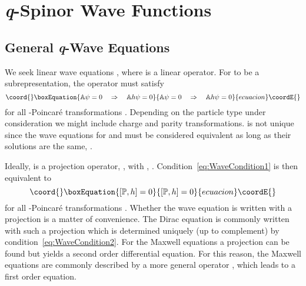 \documentclass[12pt,a4paper]{article}
\providecommand{\Proj}{\mathbb{P}}
\begin{document}
\section{\textit{q}-Spinor Wave Functions}

\subsection{General \textit{q}-Wave Equations}

We seek linear wave equations \coordHE{}, where \coordHE{}
is a linear operator. For \coordHE{} to be a subrepresentation,
the operator must satisfy
\begin{equation}\coord{}\boxEquation{
\label{eq:WaveCondition1}
  \mathbb{A}\psi = 0 \quad\Rightarrow\quad \mathbb{A}h\psi = 0
}{
\mathbb{A}\psi = 0 \quad\Rightarrow\quad \mathbb{A}h\psi = 0
}{ecuacion}\coordE{}\end{equation}
for all \coordHE{}-Poincar{\'e} transformations \coordHE{}. Depending on the particle
type under consideration we might include charge and parity
transformations. \coordHE{} is not unique since the wave
equations for \coordHE{} and \coordHE{} must be considered
equivalent as long as their solutions are the same, \coordHE{}. 

Ideally, \coordHE{} is a projection operator, \myHighlight{$\mathbb{A}=\Proj$}\coordHE{},
with \myHighlight{$\Proj^2=\Proj$}\coordHE{}, \myHighlight{$\Proj^* = \Proj$}\coordHE{}.
Condition~\eqref{eq:WaveCondition1} is then equivalent to
\begin{equation}\coord{}\boxEquation{
\label{eq:WaveCondition2}
  [\Proj,h] = 0
}{
[\Proj,h] = 0
}{ecuacion}\coordE{}\end{equation}
for all \coordHE{}-Poincar{\'e} transformations \coordHE{}. Whether the wave equation is
written with a projection is a matter of convenience. The Dirac
equation is commonly written with such a projection which is determined
uniquely (up to complement) by condition~\eqref{eq:WaveCondition2}.
For the Maxwell equations a projection can be found but yields a second
order differential equation. For this reason, the Maxwell equations
are commonly described by a more general operator \coordHE{}, which
leads to a first order equation. 
\end{document}
